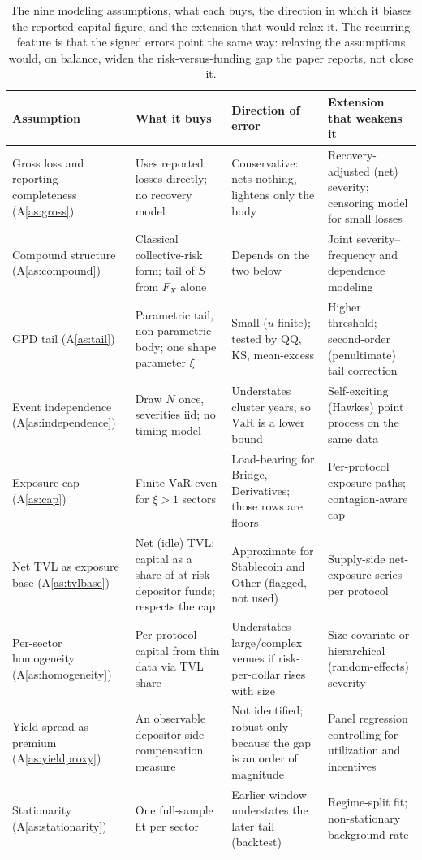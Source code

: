 \documentclass[11pt]{article}
\theoremstyle{definition}
\theoremstyle{remark}
\theoremstyle{definition}
\newcommand{\VaR}{\mathrm{VaR}}
\newcommand{\1}{\mathbf{1}}
\begin{document}
\begin{table}[t]
\centering
\footnotesize
\begin{tabular}{@{}L{2.5cm} L{4.0cm} L{2.6cm} L{4.0cm}@{}}
\toprule
Assumption & What it buys & Direction of error & Extension that weakens it \\
\midrule
Gross loss and reporting completeness (A\ref{as:gross}) &
Uses reported losses directly; no recovery model &
Conservative: nets nothing, lightens only the body &
Recovery-adjusted (net) severity; censoring model for small losses \\[2pt]
Compound structure (A\ref{as:compound}) &
Classical collective-risk form; tail of $S$ from $F_X$ alone &
Depends on the two below &
Joint severity--frequency and dependence modeling \\[2pt]
GPD tail (A\ref{as:tail}) &
Parametric tail, non-parametric body; one shape parameter $\xi$ &
Small ($u$ finite); tested by QQ, KS, mean-excess &
Higher threshold; second-order (penultimate) tail correction \\[2pt]
Event independence (A\ref{as:independence}) &
Draw $N$ once, severities iid; no timing model &
Understates cluster years, so $\VaR$ is a lower bound &
Self-exciting (Hawkes) point process on the same data \\[2pt]
Exposure cap (A\ref{as:cap}) &
Finite $\VaR$ even for $\xi>1$ sectors &
Load-bearing for Bridge, Derivatives; those rows are floors &
Per-protocol exposure paths; contagion-aware cap \\[2pt]
Net TVL as exposure base (A\ref{as:tvlbase}) &
Net (idle) TVL: capital as a share of at-risk depositor funds; respects the cap &
Approximate for Stablecoin and Other (flagged, not used) &
Supply-side net-exposure series per protocol \\[2pt]
Per-sector homogeneity (A\ref{as:homogeneity}) &
Per-protocol capital from thin data via TVL share &
Understates large/complex venues if risk-per-dollar rises with size &
Size covariate or hierarchical (random-effects) severity \\[2pt]
Yield spread as premium (A\ref{as:yieldproxy}) &
An observable depositor-side compensation measure &
Not identified; robust only because the gap is an order of magnitude &
Panel regression controlling for utilization and incentives \\[2pt]
Stationarity (A\ref{as:stationarity}) &
One full-sample fit per sector &
Earlier window understates the later tail (backtest) &
Regime-split fit; non-stationary background rate \\
\bottomrule
\end{tabular}
\caption{The nine modeling assumptions, what each buys, the direction in which
it biases the reported capital figure, and the extension that would relax it.
The recurring feature is that the signed errors point the same way: relaxing the
assumptions would, on balance, widen the risk-versus-funding gap the paper
reports, not close it.}
\label{tab:assumptions}
\end{table}
\end{document}
